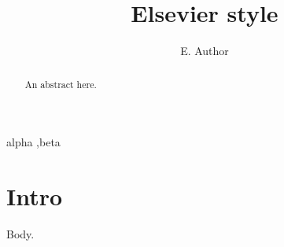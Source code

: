 \documentclass{elsarticle}
\begin{document}
\begin{frontmatter}
\title{Elsevier style}
\author{E. Author}
\begin{abstract}
An abstract here.
\end{abstract}
\begin{keyword}
alpha \sep beta
\end{keyword}
\end{frontmatter}
\section{Intro}
Body.
\end{document}
